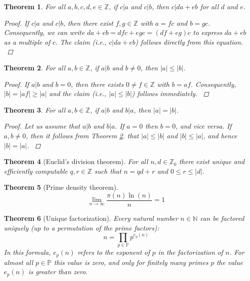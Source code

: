 \documentclass{book}
\newcommand{\fun}[2]{\ensuremath{#1\left(#2\right)}}
\newcommand{\NNN}{\ensuremath{\mathbb{N}}}
\newcommand{\PPP}{\ensuremath{\mathbb{P}}}
\newcommand{\ZZZ}{\ensuremath{\mathbb{Z}}}
\newtheorem{theo}{Theorem}
\begin{document}
\begin{theo}
For all $a,b,c,d,e\in\ZZZ$, if $c|a$ and $c|b$, then $c|da+eb$ for all $d$ and $e$.
\begin{proof}
If $c|a$ and $c|b$, then there exist $f,g\in\ZZZ$ with $a=fc$ and $b=gc$. Consequently, we can write $da+eb=dfc+egc=\left(df+eg\right)c$ to express $da+eb$ as a multiple of $c$. The claim (i.e., $c|da+eb$) follows directly from this equation.
\cite{Oppliger:2011:CC:2049860}
\end{proof}
\end{theo}

\begin{theo}
\label{theo4}
For all $a,b\in\ZZZ$, if $a|b$ and $b\neq0$, then $\left|a\right|\leq\left|b\right|$.
\begin{proof}
If $a|b$ and $b=0$, then there exists $0\neq f\in\ZZZ$ with $b=af$. Consequently, $\left|b\right|=\left|af\right|\geq\left|a\right|$ and the claim (i.e., $\left|a\right|\leq\left|b\right|$) follows immediately.
\cite{Oppliger:2011:CC:2049860}
\end{proof}
\end{theo}

\begin{theo}
For all $a,b\in\ZZZ$, if $a|b$ and $b|a$, then $\left|a\right|=\left|b\right|$.
\begin{proof}
Let us assume that $a|b$ and $b|a$. If $a=0$ then $b=0$, and vice versa. If $a,b\neq 0$, then it follows from Theorem \ref{theo4}. that $\left|a\right|\leq\left|b\right|$ and $\left|b\right|\leq\left|a\right|$, and hence $\left|b\right|=\left|a\right|$.
\cite{Oppliger:2011:CC:2049860}
\end{proof}
\end{theo}

\begin{theo}[Euclid's division theorem]
For all $n,d\in\ZZZ_0$ there exist unique and efficiently computable $q,r\in\ZZZ$ such that $n=qd+r$ and $0\leq r\leq\left|d\right|$.
\cite{Oppliger:2011:CC:2049860}
\end{theo}

\begin{theo}[Prime density theorem]
\begin{equation}
\displaystyle\lim_{n\rightarrow\infty}\displaystyle\frac{\pi\left(n\right)\ln\left(n\right)}{n}=1
\end{equation}
\cite{Oppliger:2011:CC:2049860}
\end{theo}

\begin{theo}[Unique factorization]
Every natural number $n\in\NNN$ can be factored uniquely (up to a permutation of the prime factors):
\begin{equation}
n=\displaystyle\prod_{p\in\PPP}{p^{\fun{e_p}{n}}}
\end{equation}
In this formula, $\fun{e_p}{n}$ refers to the exponent of $p$ in the factorization of $n$. For almost all $p\in\PPP$ this value is zero, and only for finitely many primes $p$ the value $\fun{e_p}{n}$ is greater than zero.
\cite{Oppliger:2011:CC:2049860}
\end{theo}
\end{document}
